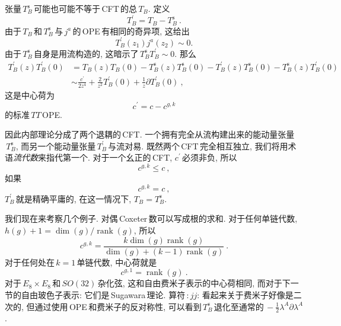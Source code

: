 张量$\,T_{B}^{\mathrm{s}}\,$可能也可能不等于\,CFT\,的总$\,T_{B}$. 定义
\begin{equation}
    T_{B}^{\prime} = T_{B} - T_{B}^{\mathrm{s}} \:. \label{11.5.28}
\end{equation}
由于$\,T_{B}\,$和$\,T_{B}^{\mathrm{s}}\,$与$\,j^{a}\,$的\,OPE\,有相同的奇异项, 这给出
\begin{equation}
    T_{B}^{\prime}(z_{1})j^{a}(z_{2})\sim 0 . \label{11.5.29}
\end{equation}
由于$\,T_{B}^{\mathrm{s}}\,$自身是用流构造的, 这暗示了$\,T_{B}^{\mathrm{s}}T_{B}^{\prime}\sim 0$. 那么
\begin{align}
    T_{B}^{\prime}(z)T_{B}^{\prime}(0) &= T_{B}(z)T_{B}(0)-T_{B}^{\mathrm{s}}(z)T_{B}^{\mathrm{s}}(0)
    -T_{B}^{\prime}(z)T_{B}^{\mathrm{s}}(0) - T_{B}^{\mathrm{s}}(z)T_{B}^{\prime}(0) \nonumber \\
    &\sim \frac{c^{\prime}}{2z^{4}}+\frac{2}{z^{2}}T_{B}^{\prime}(0) +\frac{1}{z}\partial T_{B}^{\prime}(0)\:,
    \label{11.5.30}
\end{align}
这是中心荷为
\begin{equation}
    c^{\prime}=c-c^{g,k} \label{11.5.31}
\end{equation}
的标准$\,TT\,$OPE. 

因此内部理论分成了两个退耦的\,CFT. 一个拥有完全从流构建出来的能动量张量$\,T_{B}^{\mathrm{s}}$, 而另一个能动量张量$\,T_{B}^{\prime}\,$与流对易. 既然两个\,CFT\,完全相互独立, 我们将用术语{\emph{流代数}}来指代第一个. 对于一个幺正的\,CFT, $c^{\prime}\,$必须非负, 所以
\begin{equation}
    c^{g,k}\leq c \:, \label{11.5.32}
\end{equation}
如果
\begin{equation}
    c^{g,k}=c \:, \label{11.5.33}
\end{equation}
$T_{B}^{\prime}\,$就是精确平庸的, 在这一情况下, $T_{B}=T_{B}^{\mathrm{s}}$.

我们现在来考察几个例子. 对偶\,Coxeter\,数可以写成根的求和. 对于任何单链代数, $h(g)+1=\operatorname{dim}(g)/\operatorname{rank}(g)$, 所以
\begin{equation}
    c^{g,k} = \frac{k\operatorname{dim}(g)\operatorname{rank}(g)}{\operatorname{dim}(g)+(k-1)\operatorname{rank}(g)}
    \:. \label{11.5.34}
\end{equation}
对于任何处在$\,k=1\,$单链代数, 中心荷就是
\begin{equation}
    c^{g,1}=\operatorname{rank}(g) \:. \label{11.5.35}
\end{equation}
对于$\,E_{8}\times E_{8}\,$和$\,SO(32)\,$杂化弦, 这和自由费米子表示的中心荷相同, 而对于下一节的自由玻色子表示: 它们是\,Sugawara\,理论. 算符$\,:jj:\,$看起来关于费米子好像是二次的, 但通过使用\,OPE\,和费米子的反对称性, 可以看到$\,T_{B}^{\mathrm{s}}\,$退化至通常的$\,-\tfrac{1}{2}\lambda^{A}\partial\lambda^{A}$.

